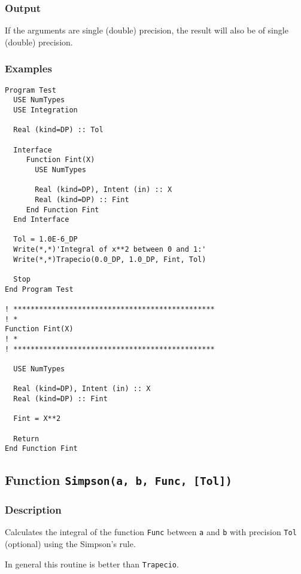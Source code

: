 \subsubsection{Output}

If the arguments are single (double) precision, the result will also be of
single (double) precision. 



\subsubsection{Examples}

\begin{verbatim}
Program Test
  USE NumTypes
  USE Integration

  Real (kind=DP) :: Tol

  Interface 
     Function Fint(X)
       USE NumTypes

       Real (kind=DP), Intent (in) :: X
       Real (kind=DP) :: Fint
     End Function Fint
  End Interface

  Tol = 1.0E-6_DP
  Write(*,*)'Integral of x**2 between 0 and 1:'
  Write(*,*)Trapecio(0.0_DP, 1.0_DP, Fint, Tol)

  Stop
End Program Test

! ***********************************************
! *
Function Fint(X)
! *  
! ***********************************************

  USE NumTypes

  Real (kind=DP), Intent (in) :: X
  Real (kind=DP) :: Fint

  Fint = X**2

  Return
End Function Fint
\end{verbatim}

\subsection{Function \texttt{Simpson(a, b, Func, [Tol])}}

\subsubsection{Description}

Calculates the integral of the function \texttt{Func} between
\texttt{a} and \texttt{b} with precision \texttt{Tol} (optional) using
the Simpson's rule.

In general this routine is better than \texttt{Trapecio}.

